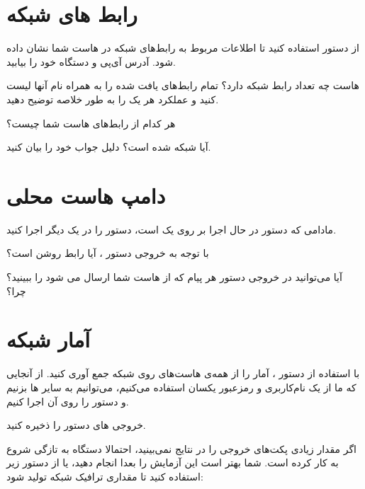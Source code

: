 \documentclass{../UTNetLabFa}
\begin{document}
	\section{رابط های شبکه}
	از دستور  استفاده کنید تا اطلاعات مربوط به رابط‌های شبکه در هاست شما نشان داده شود. آدرس آی‌پی و \mbox{} دستگاه خود را بیابید.
	
		\begin{report}
			\item هاست چه تعداد رابط شبکه دارد؟ تمام رابط‌های یافت شده را به همراه نام آنها لیست کنید و عملکرد هر یک را به طور خلاصه توضیح دهید.
			\item {} هر کدام از رابط‌های هاست شما چیست؟
			\item 	آیا شبکه  شده است؟ دلیل جواب خود را بیان کنید. 
		\end{report}
	


	\section{دامپ هاست محلی}
	 مادامی که دستور  در حال اجرا بر روی یک \mbox{} است، دستور  را در یک \mbox{} دیگر اجرا کنید.

		\begin{report}
			\item با توجه به خروجی دستور  ، آیا رابط  روشن است؟
			\item آیا می‌توانید در خروجی دستور  هر پیام  که از هاست شما ارسال می شود را   ببینید؟ چرا؟
	
		\end{report}
	
	\section{آمار شبکه}
	
	با استفاده از دستور  ، آمار را از همه‌ی هاست‌های روی شبکه جمع آوری کنید. از آنجایی که ما از یک نام‌کاربری و رمزعبور یکسان استفاده می‌کنیم، می‌توانیم به سایر  ها  بزنیم و دستور  را روی آن اجرا کنیم.

	خروجی های دستور  را ذخیره کنید.

	اگر مقدار زیادی پکت‌های خروجی را در نتایج  نمی‌بینید، احتمالا دستگاه به تازگی شروع به کار کرده است.
	شما بهتر است این آزمایش را بعدا انجام دهید، یا از دستور  زیر استفاده کنید تا مقداری ترافیک شبکه تولید شود:
\end{document}
